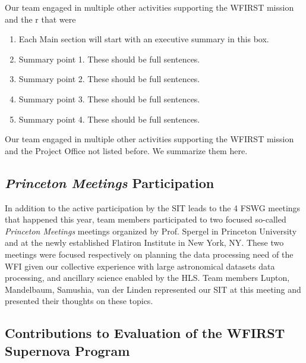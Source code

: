 

\begin{summary}
Our team engaged in multiple other activities supporting the WFIRST mission and the r that were
\begin{enumerate}
\item Each Main section will start with an executive summary in this box.
\item Summary point 1. These should be full sentences.
\item Summary point 2. These should be full sentences.
\item Summary point 3. These should be full sentences.
\item Summary point 4. These should be full sentences.
\end{enumerate}
\end{summary}

Our team engaged in multiple other activities supporting the WFIRST mission and the Project Office not listed before. We summarize them here.

\subsection{\emph{Princeton Meetings} Participation}

In addition to the active participation by the SIT leads to the 4 FSWG meetings that happened this year, team members participated to two focused so-called \emph{Princeton Meetings} meetings organized by Prof. Spergel in Princeton University and at the newly established Flatiron Institute in  New York, NY. These two meetings were focused respectively on planning the data processing need of the WFI given our collective experience with large astronomical datasets data processing, and ancillary science enabled by the HLS. Team members Lupton, Mandelbaum, Samushia, van der Linden represented our SIT at this meeting and presented their thoughts on these topics.

\subsection{Contributions to Evaluation of the WFIRST Supernova Program}

